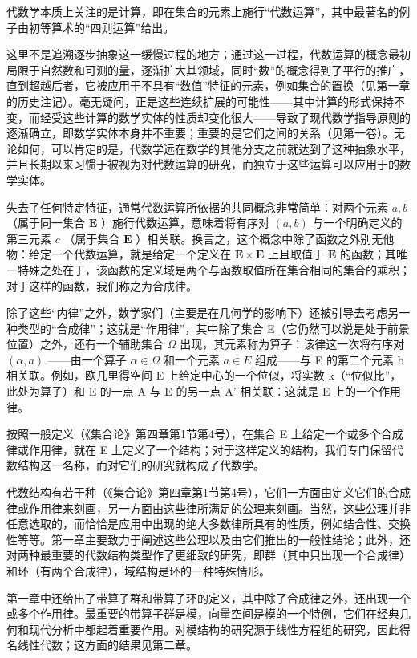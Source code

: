 
代数学本质上关注的是计算，即在集合的元素上施行“代数运算”，其中最著名的例子由初等算术的“四则运算”给出。

这里不是追溯逐步抽象这一缓慢过程的地方；通过这一过程，代数运算的概念最初局限于自然数和可测的量，逐渐扩大其领域，同时“数”的概念得到了平行的推广，直到超越后者，它被应用于不具有“数值”特征的元素，例如集合的置换（见第一章的历史注记）。毫无疑问，正是这些连续扩展的可能性——其中计算的形式保持不变，而经受这些计算的数学实体的性质却变化很大——导致了现代数学指导原则的逐渐确立，即数学实体本身并不重要；重要的是它们之间的关系（见第一卷）。无论如何，可以肯定的是，代数学远在数学的其他分支之前就达到了这种抽象水平，并且长期以来习惯于被视为对代数运算的研究，而独立于这些运算可以应用于的数学实体。

失去了任何特定特征，通常代数运算所依据的共同概念非常简单：对两个元素 \(a, b\) （属于同一集合 \(\mathbf{E}\) ）施行代数运算，意味着将有序对 \((a, b)\) 与一个明确定义的第三元素 \(c\) （属于集合 \(\mathbf{E}\) ）相关联。换言之，这个概念中除了函数之外别无他物：给定一个代数运算，就是给定一个定义在 \(\mathbf{E} \times \mathbf{E}\) 上且取值于 \(\mathbf{E}\) 的函数；其唯一特殊之处在于，该函数的定义域是两个与函数取值所在集合相同的集合的乘积；对于这样的函数，我们称之为合成律。

除了这些“内律”之外，数学家们（主要是在几何学的影响下）还被引导去考虑另一种类型的“合成律”；这就是“作用律”，其中除了集合 E（它仍然可以说是处于前景位置）之外，还有一个辅助集合 \(\Omega\) 出现，其元素称为算子：该律这一次将有序对 \((\alpha, a)\) ——由一个算子 \(\alpha \in \Omega\) 和一个元素 \(a \in E\) 组成——与 E 的第二个元素 b 相关联。例如，欧几里得空间 E 上给定中心的一个位似，将实数 k（“位似比”，此处为算子）和 E 的一点 A 与 E 的另一点 A' 相关联：这就是 E 上的一个作用律。

按照一般定义（《集合论》第四章第1节第4号），在集合 E 上给定一个或多个合成律或作用律，就在 E 上定义了一个结构；对于这样定义的结构，我们专门保留代数结构这一名称，而对它们的研究就构成了代数学。

代数结构有若干种（《集合论》第四章第1节第4号），它们一方面由定义它们的合成律或作用律来刻画，另一方面由这些律所满足的公理来刻画。当然，这些公理并非任意选取的，而恰恰是应用中出现的绝大多数律所具有的性质，例如结合性、交换性等等。第一章主要致力于阐述这些公理以及由它们推出的一般性结论；此外，还对两种最重要的代数结构类型作了更细致的研究，即群（其中只出现一个合成律）和环（有两个合成律），域结构是环的一种特殊情形。

第一章中还给出了带算子群和带算子环的定义，其中除了合成律之外，还出现一个或多个作用律。最重要的带算子群是模，向量空间是模的一个特例，它们在经典几何和现代分析中都起着重要作用。对模结构的研究源于线性方程组的研究，因此得名线性代数；这方面的结果见第二章。

